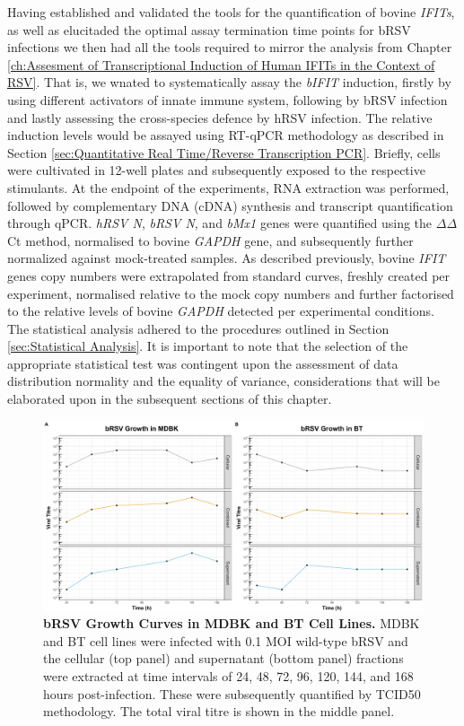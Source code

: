 Having established and validated the tools for the quantification of bovine \textit{IFITs}, as well as elucitaded the optimal assay termination time points for bRSV infections we then had all the tools required to mirror the analysis from Chapter \ref{ch:Assesment of Transcriptional Induction of Human IFITs in the Context of RSV}. That is, we wnated to systematically assay the \textit{bIFIT} induction, firstly by using different activators of innate immune system, following by bRSV infection and lastly assessing the cross-species defence by hRSV infection. The relative induction levels would be assayed using RT-qPCR methodology as described in Section \ref{sec:Quantitative Real Time/Reverse Transcription PCR}. Briefly, cells were cultivated in 12-well plates and subsequently exposed to the respective stimulants. At the endpoint of the experiments, RNA extraction was performed, followed by complementary DNA (cDNA) synthesis and transcript quantification through qPCR. \textit{hRSV N}, \textit{bRSV N}, and \textit{bMx1} genes were quantified using the \(\Delta\)\(\Delta\)Ct method, normalised to bovine \textit{GAPDH} gene, and subsequently further normalized against mock-treated samples. As described previously, bovine \textit{IFIT} genes copy numbers were extrapolated from standard curves, freshly created per experiment, normalised relative to the mock copy numbers and further factorised to the relative levels of bovine \textit{GAPDH} detected per experimental conditions. The statistical analysis adhered to the procedures outlined in Section \ref{sec:Statistical Analysis}. It is important to note that the selection of the appropriate statistical test was contingent upon the assessment of data distribution normality and the equality of variance, considerations that will be elaborated upon in the subsequent sections of this chapter.

\begin{figure}
    \centering
    \includegraphics[width=1\linewidth]{07. Chapter 2/Figs/01. Technologies/01. growth_curves.pdf}
    \caption[bRSV Growth Curves in MDBK and BT Cell Lines.]{\textbf{bRSV Growth Curves in MDBK and BT Cell Lines.} MDBK and BT cell lines were infected with 0.1 MOI wild-type bRSV and the cellular (top panel) and supernatant (bottom panel) fractions were extracted at time intervals of 24, 48, 72, 96, 120, 144, and 168 hours post-infection. These were subsequently quantified by TCID50 methodology. The total viral titre is shown in the middle panel.}
    \label{fig:bRSV growth curves in MDBK and BT cell lines}
\end{figure}

